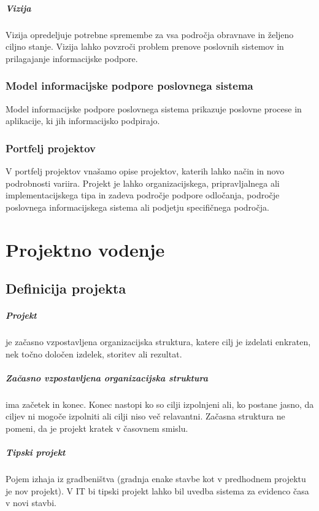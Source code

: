\documentclass[a4paper,12pt]{report}
\begin{document}
         \paragraph{Vizija} Vizija opredeljuje potrebne spremembe za vsa področja obravnave in željeno ciljno stanje. Vizija lahko povzroči problem prenove poslovnih sistemov in prilagajanje informacijske podpore.

      \subsection{Model informacijske podpore poslovnega sistema}
         Model informacijske podpore poslovnega sistema prikazuje poslovne procese in aplikacije, ki jih informacijsko podpirajo.

      \subsection{Portfelj projektov}
         V portfelj projektov vnašamo opise projektov, katerih lahko način in novo podrobnosti variira. Projekt je lahko organizacijskega, pripravljalnega ali implementacijskega tipa in zadeva področje podpore odločanja, področje poslovnega informacijskega sistema ali podjetju specifičnega področja.


\chapter{Projektno vodenje}
   \section{Definicija projekta}
      \paragraph{Projekt} je začasno vzpostavljena organizacijska struktura, katere cilj je izdelati enkraten, nek točno določen izdelek, storitev ali rezultat.
      \paragraph{Začasno vzpostavljena organizacijska struktura} ima začetek in konec. Konec nastopi ko so cilji izpolnjeni ali, ko postane jasno, da ciljev ni mogoče izpolniti ali cilji niso več relavantni. Začasna struktura ne pomeni, da je projekt kratek v časovnem smislu.
      \paragraph{Tipski projekt} Pojem izhaja iz gradbeništva (gradnja enake stavbe kot v predhodnem projektu je nov projekt). V IT bi tipski projekt lahko bil uvedba sistema za evidenco časa v novi stavbi.
\end{document}
